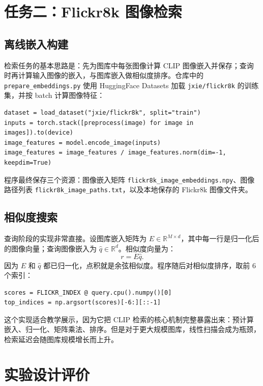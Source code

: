 \documentclass[UTF8,zihao=-4]{ctexart}
\begin{document}
\section{任务二：Flickr8k 图像检索}

\subsection{离线嵌入构建}

检索任务的基本思路是：先为图库中每张图像计算 CLIP 图像嵌入并保存；查询时再计算输入图像的嵌入，与图库嵌入做相似度排序。仓库中的 \texttt{prepare\_embeddings.py} 使用 HuggingFace Datasets 加载 \texttt{jxie/flickr8k} 的训练集，并按 batch 计算图像特征：
\begin{lstlisting}
dataset = load_dataset("jxie/flickr8k", split="train")
inputs = torch.stack([preprocess(image) for image in images]).to(device)
image_features = model.encode_image(inputs)
image_features = image_features / image_features.norm(dim=-1, keepdim=True)
\end{lstlisting}

程序最终保存三个资源：图像嵌入矩阵 \texttt{flickr8k\_image\_embeddings.npy}、图像路径列表 \texttt{flickr8k\_image\_paths.txt}，以及本地保存的 Flickr8k 图像文件夹。

\subsection{相似度搜索}

查询阶段的实现非常直接。设图库嵌入矩阵为 $E \in \mathbb{R}^{M \times d}$，其中每一行是归一化后的图像向量；查询图像嵌入为 $\hat{q} \in \mathbb{R}^{d}$。相似度向量为：
\begin{equation}
  r = E\hat{q}.
\end{equation}
因为 $E$ 和 $\hat{q}$ 都已归一化，点积就是余弦相似度。程序随后对相似度排序，取前 6 个索引：
\begin{lstlisting}
scores = FLICKR_INDEX @ query.cpu().numpy()[0]
top_indices = np.argsort(scores)[-6:][::-1]
\end{lstlisting}

这个实现适合教学展示，因为它把 CLIP 检索的核心机制完整暴露出来：预计算嵌入、归一化、矩阵乘法、排序。但是对于更大规模图库，线性扫描会成为瓶颈，检索延迟会随图库规模增长而上升。

\section{实验设计评价}
\end{document}
